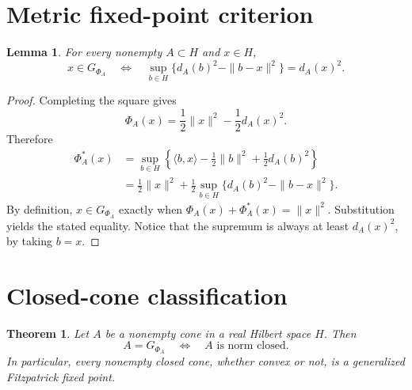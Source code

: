 \documentclass[11pt]{article}
\newtheorem{theorem}{Theorem}
\newtheorem{lemma}{Lemma}
\begin{document}
\section{Metric fixed-point criterion}
\begin{lemma}\label{lem:criterion}
For every nonempty $A\subset H$ and $x\in H$,
\[
 x\in G_{\Phi_A}
 \quad\Longleftrightarrow\quad
 \sup_{b\in H}\{d_A(b)^2-\|b-x\|^2\}=d_A(x)^2.
\]
\end{lemma}

\begin{proof}
Completing the square gives
\[
 \Phi_A(x)=\frac12\|x\|^2-\frac12d_A(x)^2.
\]
Therefore
\begin{align*}
 \Phi_A^*(x)
 &=\sup_{b\in H}
   \left\{\langle b,x\rangle-\frac12\|b\|^2+\frac12d_A(b)^2\right\}\\
 &=\frac12\|x\|^2+\frac12
   \sup_{b\in H}\{d_A(b)^2-\|b-x\|^2\}.
\end{align*}
By definition, $x\in G_{\Phi_A}$ exactly when
$\Phi_A(x)+\Phi_A^*(x)=\|x\|^2$. Substitution yields the stated equality.
Notice that the supremum is always at least $d_A(x)^2$, by taking $b=x$.
\end{proof}

\section{Closed-cone classification}
\begin{theorem}\label{thm:main}
Let $A$ be a nonempty cone in a real Hilbert space $H$. Then
\[
 A=G_{\Phi_A}\quad\Longleftrightarrow\quad A\text{ is norm closed}.
\]
In particular, every nonempty closed cone, whether convex or not, is a
generalized Fitzpatrick fixed point.
\end{theorem}
\end{document}
